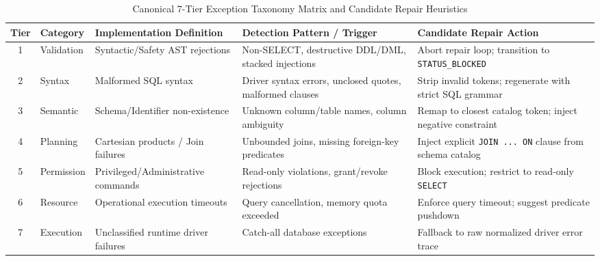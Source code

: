 \begin{table}[t]
\centering
\caption{Canonical 7-Tier Exception Taxonomy Matrix and Candidate Repair Heuristics}
\label{tab:taxonomy}
\footnotesize
\setlength{\tabcolsep}{4.5pt}
\renewcommand{\arraystretch}{1.04}
\begin{tabularx}{\textwidth}{@{}c l l l X@{}}
\toprule
\textbf{Tier} & \textbf{Category} & \textbf{Implementation Definition} & \textbf{Detection Pattern / Trigger} & \textbf{Candidate Repair Action} \\
\midrule
1 & Validation & Syntactic/Safety AST rejections & Non-SELECT, destructive DDL/DML, stacked injections & Abort repair loop; transition to \texttt{STATUS\_BLOCKED} \\
2 & Syntax & Malformed SQL syntax & Driver syntax errors, unclosed quotes, malformed clauses & Strip invalid tokens; regenerate with strict SQL grammar \\
3 & Semantic & Schema/Identifier non-existence & Unknown column/table names, column ambiguity & Remap to closest catalog token; inject negative constraint \\
4 & Planning & Cartesian products / Join failures & Unbounded joins, missing foreign-key predicates & Inject explicit \texttt{JOIN ... ON} clause from schema catalog \\
5 & Permission & Privileged/Administrative commands & Read-only violations, grant/revoke rejections & Block execution; restrict to read-only \texttt{SELECT} \\
6 & Resource & Operational execution timeouts & Query cancellation, memory quota exceeded & Enforce query timeout; suggest predicate pushdown \\
7 & Execution & Unclassified runtime driver failures & Catch-all database exceptions & Fallback to raw normalized driver error trace \\
\bottomrule
\end{tabularx}
\end{table}

